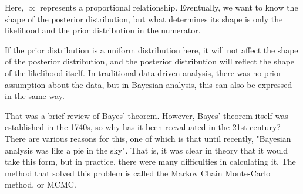 \documentclass{ltjsbook}
\begin{document}
Here, $\propto$ represents a proportional relationship. Eventually, we want to know the shape of the posterior distribution, but what determines its shape is only the likelihood and the prior distribution in the numerator.

If the prior distribution is a uniform distribution here, it will not affect the shape of the posterior distribution, and the posterior distribution will reflect the shape of the likelihood itself. In traditional data-driven analysis, there was no prior assumption about the data, but in Bayesian analysis, this can also be expressed in the same way.

That was a brief review of Bayes' theorem. However, Bayes' theorem itself was established in the 1740s, so why has it been reevaluated in the 21st century? There are various reasons for this, one of which is that until recently, "Bayesian analysis was like a pie in the sky". That is, it was clear in theory that it would take this form, but in practice, there were many difficulties in calculating it. The method that solved this problem is called the Markov Chain Monte-Carlo method, or MCMC.

\end{document}
